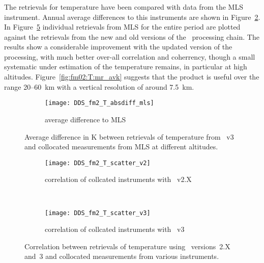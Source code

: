 
\subsubsection{}
\label{sec:fm02:comparison:temperature}
The retrievals for temperature have been compared with data from the MLS
instrument. Annual average differences to this instruments are shown in
Figure~\ref{fig:fm02:T:profiles}. In Figure~\ref{fig:fm02:T:scatter} individual
retrievals from MLS for the entire period are plotted against the
retrievals from the new and old versions of the \smr\ processing chain. The
results show a considerable improvement with the updated version of the
processing, with much better over-all correlation and coherrency, though a
small systematic under estimation of the temperature remains, in particular at
high altitudes.
Figure~\ref{fig:fm02:T:mr_avk} suggests that the product is useful over the
range 20--60~km with a vertical resolution of around 7.5~km.

\begin{figure}[tbhp]
    \centering
    \begin{subfigure}[b]{0.49\textwidth}
        \texttt{[image: DDS\_fm2\_T\_absdiff\_mls]}
        \caption{average difference to MLS}
        \label{fig:fm02:T:profiles:MLS}
    \end{subfigure}
    \caption{Average difference in K between retrievals of temperature from
    \smr~v3 and collocated measurements from MLS at different altitudes.}
    \label{fig:fm02:T:profiles}
\end{figure}

\begin{figure}[tbhp]
    \centering
    \begin{subfigure}[b]{0.49\textwidth}
        \texttt{[image: DDS\_fm2\_T\_scatter\_v2]}
        \caption{correlation of collcated instruments with \smr~v2.X}
        \label{fig:fm02:T:scatter:v2}
    \end{subfigure}
    \,
    \begin{subfigure}[b]{0.49\textwidth}
        \texttt{[image: DDS\_fm2\_T\_scatter\_v3]}
        \caption{correlation of collcated instruments with \smr~v3}
        \label{fig:fm02:T:scatter:v3}
    \end{subfigure}
    \caption{Correlation between retrievals of temperature using \smr\
    versions~2.X and~3 and collocated measurements from various instruments.}
    \label{fig:fm02:T:scatter}
\end{figure}


